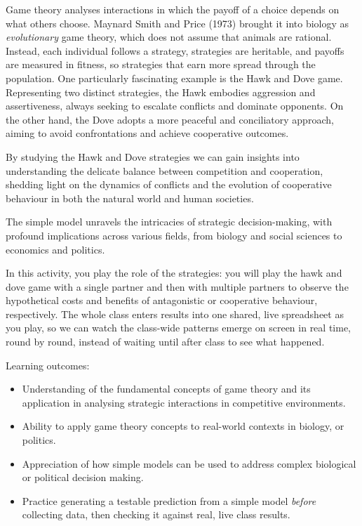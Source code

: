 \documentclass[
  a4paper]{book}
\providecommand{\tightlist}{%
  \setlength{\itemsep}{0pt}\setlength{\parskip}{0pt}}
\begin{document}
Game theory analyses interactions in which the payoff of a choice depends on what others choose. Maynard Smith and Price (1973) brought it into biology as \emph{evolutionary} game theory, which does not assume that animals are rational. Instead, each individual follows a strategy, strategies are heritable, and payoffs are measured in fitness, so strategies that earn more spread through the population. One particularly fascinating example is the Hawk and Dove game. Representing two distinct strategies, the Hawk embodies aggression and assertiveness, always seeking to escalate conflicts and dominate opponents. On the other hand, the Dove adopts a more peaceful and conciliatory approach, aiming to avoid confrontations and achieve cooperative outcomes.

By studying the Hawk and Dove strategies we can gain insights into understanding the delicate balance between competition and cooperation, shedding light on the dynamics of conflicts and the evolution of cooperative behaviour in both the natural world and human societies.

The simple model unravels the intricacies of strategic decision-making, with profound implications across various fields, from biology and social sciences to economics and politics.

In this activity, you play the role of the strategies: you will play the hawk and dove game with a single partner and then with multiple partners to observe the hypothetical costs and benefits of antagonistic or cooperative behaviour, respectively. The whole class enters results into one shared, live spreadsheet as you play, so we can watch the class-wide patterns emerge on screen in real time, round by round, instead of waiting until after class to see what happened.

Learning outcomes:

\begin{itemize}
\tightlist
\item
  Understanding of the fundamental concepts of game theory and its application in analysing strategic interactions in competitive environments.
\item
  Ability to apply game theory concepts to real-world contexts in biology, or politics.
\item
  Appreciation of how simple models can be used to address complex biological or political decision making.
\item
  Practice generating a testable prediction from a simple model \emph{before} collecting data, then checking it against real, live class results.
\end{itemize}
\end{document}
